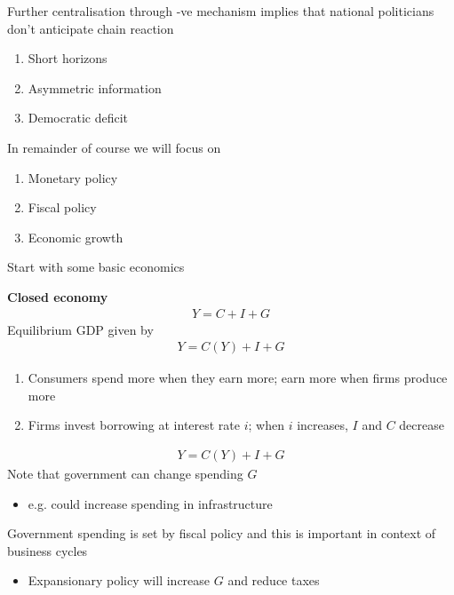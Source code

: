 \documentclass{beamer}
\begin{document}
\begin{frame}
  Further centralisation through -ve mechanism implies that national politicians don't anticipate chain reaction  
  \medskip
  \begin{enumerate}
    \item Short horizons
    \item Asymmetric information
    \item Democratic deficit
  \end{enumerate}
\end{frame}

\begin{frame}
  In remainder of course we will focus on
  \begin{enumerate}
    \item Monetary policy
    \item Fiscal policy
    \item Economic growth
  \end{enumerate}
  \medskip
  Start with some basic economics
\end{frame}

\begin{frame}
  \textbf{Closed economy}
  \begin{align}
    Y=C+I+G
  \end{align}
  \medskip
  Equilibrium GDP given by
  \begin{align}
    Y=C(Y) + I +G
  \end{align}
  \begin{enumerate}
    \item Consumers spend more when they earn more; earn more when firms produce more
    \item Firms invest borrowing at interest rate $i$; when $i$ increases, $I$ and $C$ decrease 
  \end{enumerate}  
\end{frame}

\begin{frame}
  \begin{align*}
    Y=C(Y) + I + G
  \end{align*}
  \medskip
  Note that government can change spending $G$
  \begin{itemize}
    \item e.g. could increase spending in infrastructure
  \end{itemize}
  \medskip
  Government spending is set by fiscal policy and this is important in context of business cycles
  \begin{itemize}
    \item Expansionary policy will increase $G$ and reduce taxes
  \end{itemize}
\end{frame}
\end{document}
